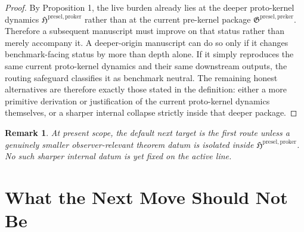 \documentclass[11pt]{article}
\newcommand{\ProtoKernelPackage}{\mathfrak H^{\mathrm{presel,proker}}}
\newcommand{\PreKernelPackage}{\mathfrak G^{\mathrm{presel,preker}}}
\newtheorem{remark}{Remark}
\begin{document}
\begin{proof}
By Proposition 1, the live burden already lies at the deeper proto-kernel dynamics \(\ProtoKernelPackage\) rather than at the current pre-kernel package \(\PreKernelPackage\). Therefore a subsequent manuscript must improve on that status rather than merely accompany it. A deeper-origin manuscript can do so only if it changes benchmark-facing status by more than depth alone. If it simply reproduces the same current proto-kernel dynamics and their same downstream outputs, the routing safeguard classifies it as benchmark neutral. The remaining honest alternatives are therefore exactly those stated in the definition: either a more primitive derivation or justification of the current proto-kernel dynamics themselves, or a sharper internal collapse strictly inside that deeper package.
\end{proof}

\begin{remark}
At present scope, the default next target is the first route unless a genuinely smaller observer-relevant theorem datum is isolated inside \(\ProtoKernelPackage\). No such sharper internal datum is yet fixed on the active line.
\end{remark}

\section{What the Next Move Should Not Be}
\end{document}
